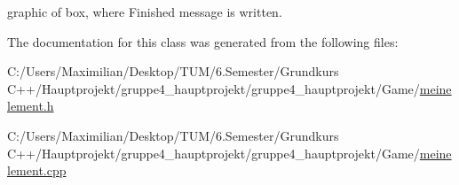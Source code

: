 graphic of box, where \textquotesingle{}Finished\textquotesingle{} message is written. 



The documentation for this class was generated from the following files\+:\begin{DoxyCompactItemize}
\item 
C\+:/\+Users/\+Maximilian/\+Desktop/\+T\+U\+M/6.\+Semester/\+Grundkurs C++/\+Hauptprojekt/gruppe4\+\_\+hauptprojekt/gruppe4\+\_\+hauptprojekt/\+Game/\hyperlink{meinelement_8h}{meinelement.\+h}\item 
C\+:/\+Users/\+Maximilian/\+Desktop/\+T\+U\+M/6.\+Semester/\+Grundkurs C++/\+Hauptprojekt/gruppe4\+\_\+hauptprojekt/gruppe4\+\_\+hauptprojekt/\+Game/\hyperlink{meinelement_8cpp}{meinelement.\+cpp}\end{DoxyCompactItemize}
